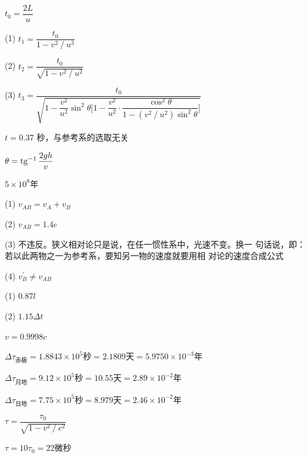 \answer $ t _ { 0 } = \dfrac { 2 L } { u } $


(1) $ t _ { 1 } = \dfrac { t _ { 0 } } { 1 - v ^ { 2 } \operatorname{/} u ^ { 3 } }   $

(2) $ t _ { 2 } = \dfrac { t _ { 0 } } { \sqrt { 1 - v ^ { 2 } \operatorname{/} u ^ { 2 } } }  $\vspace{-1em}

(3) $t_{3}=\dfrac{t_{0}}{\sqrt{1-\dfrac{v^{2}}{u^{2}} \sin ^{2} \theta \Big[1-\dfrac{v^{2}}{u^{2}}\cdot \dfrac{\cos^2\theta}{ 1-\left(v^{2} \operatorname{/} u^{2}\right) \sin ^{2} \theta}\Big]}}$

\answer $ t = 0 . 3 7 $ 秒，与参考系的选取无关

\answer $ \theta = \operatorname{tg} ^ { - 1 } \dfrac { 2 g h } { v }   $

\answer  $ 5 \times 1 0 ^ 8$年

\answer (1) $ v _ { A B } = v _ { A } + v _ { B }  $

(2) $ v _ { A B } = 1 . 4 c $

(3) 不违反。狭义相对论只是说，在任一惯性系中，光速不变。换一
句话说，即：若以此两物之一为参考系，要知另一物的速度就要用相
对论的速度合成公式

(4) $ v ^ \prime _ { B } \ne v _ { A B } $

\answer (1) $ 0.87 l $

(2) $ 1 . 1 5 \Delta t $

\answer $ v = 0 . 9 9 9 8 c   $

\answer $  \Delta \tau _ \text{赤极} = 1 . 8 8 4 3 \times 1 0 ^ { 5 } \text{秒} = 2 . 1 8 0 9  \text{天}= 5 . 9 7 5 0 \times 1 0 ^ { - 3 } \text{年} $

\answer $  \Delta \tau _ \text{月地} = 9.12 \times 1 0 ^ { 5 } \text{秒} = 10.55  \text{天}= 2.89 \times 1 0 ^ { - 2 } \text{年} $

\answer $  \Delta \tau _ \text{日地} = 7.75 \times 1 0 ^ { 5 } \text{秒} = 8.979 \text{天}= 2.46 \times 1 0 ^ { - 2 } \text{年} $

\answer $ \tau = \dfrac { \tau _ 0 } { \sqrt{ 1 - v ^ { 2 } \operatorname{/} c ^ { 2 } } } $

\answer $ \tau = 1 0 \tau _ { 0 } = 2 2   $微秒
